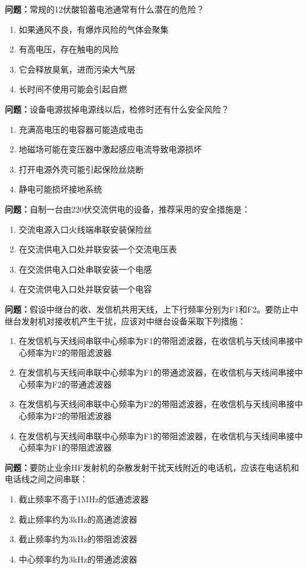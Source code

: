 \documentclass{ctexbook}
\begin{document}
\textbf{问题：}常规的12伏酸铅蓄电池通常有什么潜在的危险？
\begin{enumerate}[label=\Alph*), leftmargin=3em]
\item 如果通风不良，有爆炸风险的气体会聚集
\item 有高电压，存在触电的风险
\item 它会释放臭氧，进而污染大气层
\item 长时间不使用可能会引起自燃
\end{enumerate}

\textbf{问题：}设备电源拔掉电源线以后，检修时还有什么安全风险？
\begin{enumerate}[label=\Alph*), leftmargin=3em]
\item 充满高电压的电容器可能造成电击
\item 地磁场可能在变压器中激起感应电流导致电源损坏
\item 打开电源外壳可能引起保险丝烧断
\item 静电可能损坏接地系统
\end{enumerate}

\textbf{问题：}自制一台由220伏交流供电的设备，推荐采用的安全措施是：
\begin{enumerate}[label=\Alph*), leftmargin=3em]
\item 交流电源入口火线端串联安装保险丝
\item 在交流供电入口处并联安装一个交流电压表
\item 在交流供电入口处串联安装一个电感
\item 在交流供电入口处并联安装一个电容
\end{enumerate}

\textbf{问题：}假设中继台的收、发信机共用天线，上下行频率分别为F1和F2。要防止中继台发射机对接收机产生干扰，应该对中继台设备采取下列措施：
\begin{enumerate}[label=\Alph*), leftmargin=3em]
\item 在发信机与天线间串联中心频率为F1的带阻滤波器，在收信机与天线间串接中心频率为F2的带阻滤波器
\item 在发信机与天线间串联中心频率为F1的带通滤波器，在收信机与天线间串接中心频率为F2的带通滤波器
\item 在发信机与天线间串联中心频率为F2的带阻滤波器，在收信机与天线间串接中心频率为F2的带阻滤波器
\item 在发信机与天线间串联中心频率为F1的带阻滤波器，在收信机与天线间串接中心频率为F1的带阻滤波器
\end{enumerate}

\textbf{问题：}要防止业余HF发射机的杂散发射干扰天线附近的电话机，应该在电话机和电话线之间之间串联：
\begin{enumerate}[label=\Alph*), leftmargin=3em]
\item 截止频率不高于1MHz的低通滤波器
\item 截止频率约为3kHz的高通滤波器
\item 截止频率约为3kHz的带阻滤波器
\item 中心频率约为3kHz的带通滤波器
\end{enumerate}
\end{document}

